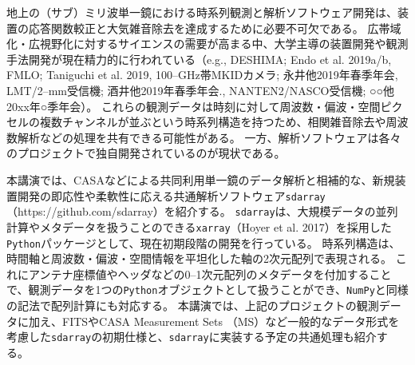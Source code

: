 \documentclass[ja]{2020a}
\begin{document}

地上の（サブ）ミリ波単一鏡における時系列観測と解析ソフトウェア開発は、装置の応答関数較正と大気雑音除去を達成するために必要不可欠である。
広帯域化・広視野化に対するサイエンスの需要が高まる中、大学主導の装置開発や観測手法開発が現在精力的に行われている（e.g., DESHIMA; Endo et al. 2019a/b, FMLO; Taniguchi et al. 2019, 100--GHz帯MKIDカメラ; 永井他2019年春季年会, LMT/2--mm受信機; 酒井他2019年春季年会., NANTEN2/NASCO受信機; ○○他20xx年○季年会）。
これらの観測データは時刻に対して周波数・偏波・空間ピクセルの複数チャンネルが並ぶという時系列構造を持つため、相関雑音除去や周波数解析などの処理を共有できる可能性がある。
一方、解析ソフトウェアは各々のプロジェクトで独自開発されているのが現状である。

本講演では、CASAなどによる共同利用単一鏡のデータ解析と相補的な、新規装置開発の即応性や柔軟性に応える共通解析ソフトウェア\texttt{sdarray}（https://github.com/sdarray）を紹介する。
\texttt{sdarray}は、大規模データの並列計算やメタデータを扱うことのできる\texttt{xarray}（Hoyer et al. 2017）を採用した\texttt{Python}パッケージとして、現在初期段階の開発を行っている。
時系列構造は、時間軸と周波数・偏波・空間情報を平坦化した軸の2次元配列で表現される。
これにアンテナ座標値やヘッダなどの0--1次元配列のメタデータを付加することで、観測データを1つの\texttt{Python}オブジェクトとして扱うことができ、\texttt{NumPy}と同様の記法で配列計算にも対応する。
本講演では、上記のプロジェクトの観測データに加え、FITSやCASA Measurement Sets （MS）など一般的なデータ形式を考慮した\texttt{sdarray}の初期仕様と、\texttt{sdarray}に実装する予定の共通処理も紹介する。

\end{document}
